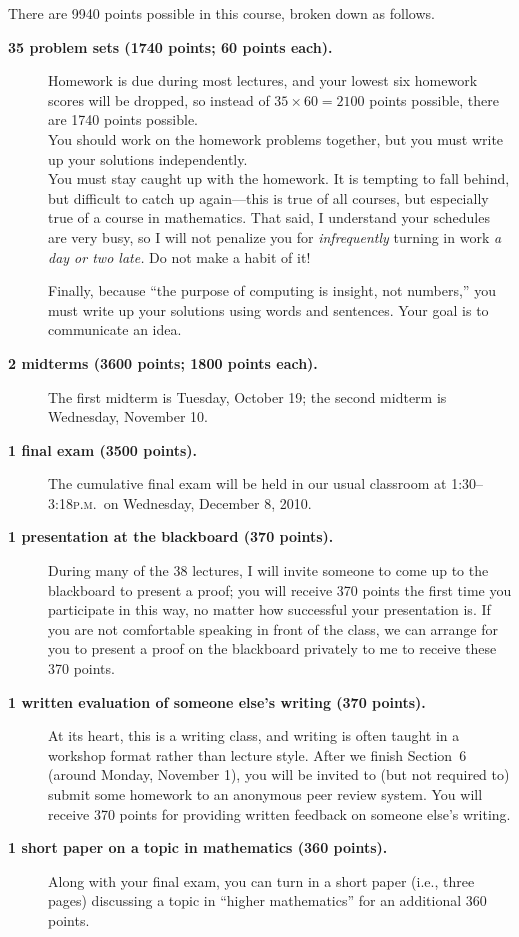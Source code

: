 \documentclass[12pt]{handout}
\newcommand{\peem}{\textsc{p.m.}}
\begin{document}
There are 9940 points possible in this course, broken down as
follows.
\begin{description}
\item[\textsf{\textbf{35 problem sets (1740 points; 60 points each).}}]  Homework is due during most lectures, and your lowest six homework scores will be dropped, so instead of $35 \times 60 = 2100$ points possible, there are 1740 points possible.\vspace{1ex}\\
      You should work on the homework problems together, but you must
      write up your solutions
      independently. \vspace{1ex}\\
      You must stay caught up with the homework.  It is tempting to
      fall behind, but difficult to catch up again---this is true of
      all courses, but especially true of a course in mathematics.
      That said, I understand your schedules are very busy, so I will
      not penalize you for \textit{infrequently} turning in work
      \textit{a day or two late.}  Do not make a habit of it!

Finally, because ``the purpose of computing is insight, not numbers,''
you must write up your solutions using words and sentences.  Your goal
is to communicate an idea.




\item[\textsf{\textbf{2 midterms (3600 points; 1800 points each).}}]
The first midterm is Tuesday, October 19; the second midterm is Wednesday, November 10.

\item[\textsf{\textbf{1 final exam (3500 points).}}]  The cumulative final exam will be held in our usual classroom at
1:30--3:18\peem\ on Wednesday, December 8, 2010.

\item[\textsf{\textbf{1 presentation at the blackboard (370 points).}}]  During many of the 38 lectures, I will invite someone to come up to the blackboard to present a proof; you will receive 370 points the first time you participate in this way, no matter how successful your presentation is.  If you are not comfortable speaking in front of the class, we can arrange for you to present a proof on the blackboard privately to me to receive these 370 points.

\item[\textsf{\textbf{1 written evaluation of someone else's writing (370 points).}}]  At its heart, this is a writing class, and writing is often taught in a workshop format rather than lecture style.  After we finish Section~6 (around Monday, November  1), you will be invited to (but not required to) submit some homework to an anonymous peer review system.  You will receive 370 points for providing written feedback on someone else's writing.

\item[\textsf{\textbf{1 short paper on a topic in mathematics (360 points).}}] Along with your final exam, you can turn in a short paper (i.e., three pages) discussing a topic in ``higher mathematics'' for an additional 360 points.

\end{description}

\vspace{1ex}
\end{document}
